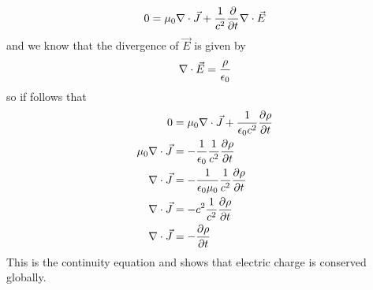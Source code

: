 \documentclass[11pt]{article}
\numberwithin{equation}{section}
\newcommand{\grad}{\bold\nabla}
\begin{document}
\begin{enumerate}[(a)]
$$0 = \mu_0\grad\cdot\vec{J}+\frac{1}{c^2}\frac{\partial}{\partial t}\grad\cdot\vec{E}$$
and we know that the divergence of $\vec{E}$ is given by
$$\grad\cdot\vec{E} = \frac{\rho}{\epsilon_0}$$
so if follows that
\begin{align*}
0 &= \mu_0\grad\cdot\vec{J}+\frac{1}{\epsilon_0c^2}\frac{\partial\rho}{\partial t}\\
\mu_0\grad\cdot\vec{J} &= -\frac{1}{\epsilon_0}\frac{1}{c^2}\frac{\partial\rho}{\partial t}\\
\grad\cdot\vec{J} &= -\frac{1}{\epsilon_0\mu_0}\frac{1}{c^2}\frac{\partial\rho}{\partial t}\\
\grad\cdot\vec{J} &= -c^2\frac{1}{c^2}\frac{\partial\rho}{\partial t}\\
\grad\cdot\vec{J} &= -\frac{\partial\rho}{\partial t}\\
\end{align*}
This is the continuity equation and shows that electric charge is conserved globally.
\end{enumerate}
\end{document}
